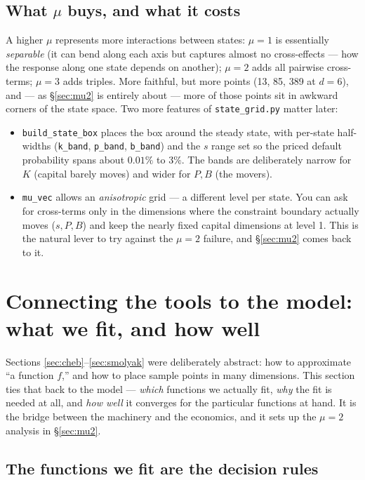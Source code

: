 \documentclass[11pt]{article}
\newcommand{\code}[1]{\texttt{#1}}
\begin{document}
\subsection{What $\mu$ buys, and what it costs}

A higher $\mu$ represents more interactions between states: $\mu=1$ is
essentially \emph{separable} (it can bend along each axis but captures almost
no cross-effects --- how the response along one state depends on another);
$\mu=2$ adds all pairwise cross-terms; $\mu=3$ adds triples. More faithful,
but more points (13, 85, 389 at $d=6$), and --- as \S\ref{sec:mu2} is
entirely about --- more of those points sit in awkward corners of the state
space. Two more features of \code{state\_grid.py} matter later:

\begin{itemize}
\item \code{build\_state\_box} places the box around the steady state, with
      per-state half-widths (\code{k\_band}, \code{p\_band}, \code{b\_band})
      and the $s$ range set so the priced default probability spans about
      $0.01\%$ to $3\%$. The bands are deliberately narrow for $K$ (capital
      barely moves) and wider for $P,B$ (the movers).
\item \code{mu\_vec} allows an \emph{anisotropic} grid --- a different level
      per state. You can ask for cross-terms only in the dimensions where
      the constraint boundary actually moves ($s,P,B$) and keep the nearly
      fixed capital dimensions at level 1. This is the natural lever to try
      against the $\mu=2$ failure, and \S\ref{sec:mu2} comes back to it.
\end{itemize}


\section{Connecting the tools to the model: what we fit, and how well}
\label{sec:connect}

Sections \ref{sec:cheb}--\ref{sec:smolyak} were deliberately abstract: how to
approximate ``a function $f$,'' and how to place sample points in many
dimensions. This section ties that back to the model --- \emph{which}
functions we actually fit, \emph{why} the fit is needed at all, and
\emph{how well} it converges for the particular functions at hand. It is the
bridge between the machinery and the economics, and it sets up the
$\mu=2$ analysis in \S\ref{sec:mu2}.

\subsection{The functions we fit are the decision rules}
\end{document}
